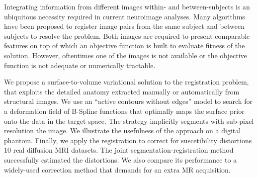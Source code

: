 Integrating information from different images within- and between-subjects
  is an ubiquitous necessity required in current neuroimage analyses.
Many algorithms have been proposed to register image pairs from the same
  subject and between subjects to resolve the problem.
Both images are required to present comparable features on top of which
  an objective function is built to evaluate fitness of the solution.
However, oftentimes one of the images is not available or the objective
  function is not adequate or numerically tractable.

We propose a surface-to-volume variational solution to the registration problem,
  that exploits the detailed anatomy extracted manually or automatically
  from structural images.
We use an ``active contours without edges'' model to search for a
  deformation field of B-Spline functions that optimally maps the
  surface prior onto the data in the target space.
The strategy implicitly segments with sub-pixel resolution the image.
We illustrate the usefulness of the approach on a digital phantom.
Finally, we apply the registration to correct for suscetibility distortions
  10 real diffusion MRI datasets.
The joint segmentation-registration method successfully estimated the
  distortions.
We also compare its performance to a widely-used correction method that
  demands for an extra MR acquisition.

